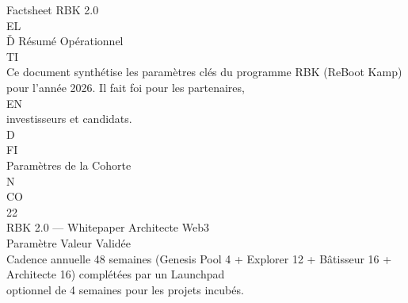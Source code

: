 \documentclass[12pt,landscape,a4paper]{article}
\begin{document}
Factsheet RBK 2.0\\
\vspace{0.5em}
\vspace{0.5em}
\vspace{0.5em}
\vspace{0.5em}
EL\\
Ď Résumé Opérationnel\\
\vspace{0.5em}
\vspace{0.5em}
\vspace{0.5em}
\vspace{0.5em}
TI\\
Ce document synthétise les paramètres clés du programme RBK (ReBoot Kamp) pour l’année 2026. Il fait foi pour les partenaires,\\
\vspace{0.5em}
\vspace{0.5em}
\vspace{0.5em}
\vspace{0.5em}
EN\\
investisseurs et candidats.\\
\vspace{0.5em}
\vspace{0.5em}
\vspace{0.5em}
\vspace{0.5em}
D\\
FI\\
Paramètres de la Cohorte\\
\vspace{0.5em}
N\\
CO\\
\vspace{0.5em}
\vspace{0.5em}
\vspace{0.5em}
\vspace{0.5em}
22\\
RBK 2.0 — Whitepaper Architecte Web3\\
\vspace{0.5em}
\vspace{0.5em}
\vspace{0.5em}
\vspace{0.5em}
Paramètre                   Valeur Validée\\
\vspace{0.5em}
Cadence annuelle            48 semaines (Genesis Pool 4 + Explorer 12 + Bâtisseur 16 + Architecte 16) complétées par un Launchpad\\
optionnel de 4 semaines pour les projets incubés.\\
\end{document}
